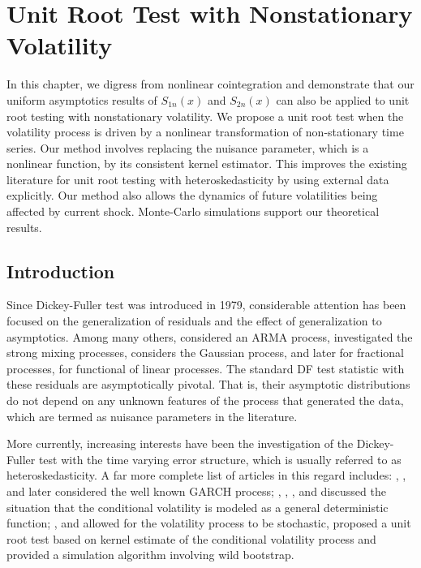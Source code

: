 \chapter{Unit Root Test with Nonstationary Volatility} 
\ifpdf
    \graphicspath{{Chapter5/Chapter5Figs/PNG/}{Chapter5/Chapter5Figs/PDF/}{Chapter5/Chapter5Figs/}}
\else
    \graphicspath{{Chapter5/Chapter5Figs/EPS/}{Chapter5/Chapter5Figs/}}
\fi
In this chapter, we digress from nonlinear cointegration and demonstrate that our uniform asymptotics results of $S_{1n}(x)$ and $S_{2n}(x)$ can also be applied to unit root testing with nonstationary volatility. We propose a unit root test when the volatility process is driven by a nonlinear transformation of non-stationary time series. Our method involves replacing the nuisance parameter, which is a nonlinear function, by its consistent kernel estimator. This improves the existing literature for unit root testing with heteroskedasticity by using external data  explicitly. Our method also allows the dynamics of future volatilities being affected by current shock. Monte-Carlo simulations support our theoretical results.


\section{Introduction}

Since Dickey-Fuller test was introduced in 1979, considerable attention  has been focused on the generalization of residuals and the effect of generalization to asymptotics. Among many others, \cite{saiddickey1984} considered an ARMA process, \cite{phillips1987} investigated  the strong mixing processes, \cite{chanterrin1995} considers the Gaussian process, \cite{sowell1990} and later \cite{wanglingulati2003} for fractional processes, \cite{wu2006} for functional of linear processes. The standard DF test statistic with these residuals are asymptotically pivotal. That is, their asymptotic distributions do not depend on any unknown features of the process that generated the data, which are termed as nuisance parameters in the literature.

More currently, increasing interests have been the investigation of the Dickey-Fuller test with the time varying error structure, which is  usually referred to as heteroskedasticity. A far more complete list of articles in this regard includes:
\cite{kimschmidt1993}, \cite{hansenrahbek1998},  \cite{boswijk2001} and later \cite{linglimcaleer2003} considered   the well known GARCH process;
\cite{hamoritokihisa1997}, \cite{kimleybournenewbold2002}, \cite{cavaliere2005}, \cite{cavalieretaylor2008a} and \cite{beare2008} discussed  the situation that the conditional volatility is modeled as a general deterministic function;
 \cite{boswijk2005},  \cite{xu2008} and  \citet[][\citeyear{cavalieretaylor2008b}, \citeyear{cavalieretaylor2009}]{cavalieretaylor2007}  allowed for the volatility process to be stochastic, proposed a unit root test based on kernel estimate of the conditional volatility process and provided a simulation algorithm involving wild bootstrap.

